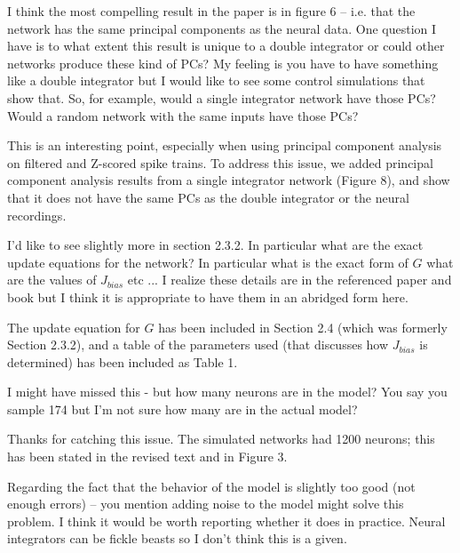 \documentclass[11pt,paper=letter]{scrartcl}
\begin{document}
\begin{quoting}
  I think the most compelling result in the paper is in figure 6 --
  i.e. that the network has the same principal components as the
  neural data. One question I have is to what extent this result is
  unique to a double integrator or could other networks produce these
  kind of PCs? My feeling is you have to have something like a double
  integrator but I would like to see some control simulations that
  show that. So, for example, would a single integrator network have
  those PCs? Would a random network with the same inputs have those
  PCs?
\end{quoting}

This is an interesting point,
especially when using principal component analysis
on filtered and Z-scored spike trains.
To address this issue, we added
principal component analysis results
from a single integrator network (Figure 8),
and show that it does not have
the same PCs as the double integrator
or the neural recordings.

\begin{quoting}
  I'd like to see slightly more in section 2.3.2. In particular what
  are the exact update equations for the network? In particular what
  is the exact form of $G$ what are the values of $J_{bias}$ etc ... I
  realize these details are in the referenced paper and book but I
  think it is appropriate to have them in an abridged form here.
\end{quoting}

The update equation for $G$ has been included in Section 2.4
(which was formerly Section 2.3.2),
and a table of the parameters used
(that discusses how $J_{bias}$ is determined)
has been included as Table 1.

\begin{quoting}
  I might have missed this - but how many neurons are in the model?
  You say you sample 174 but I'm not sure how many are in the actual
  model?
\end{quoting}

Thanks for catching this issue.
The simulated networks had 1200 neurons;
this has been stated in the revised text
and in Figure 3.

\begin{quoting}
  Regarding the fact that the behavior of the model is slightly too
  good (not enough errors) -- you mention adding noise to the model
  might solve this problem. I think it would be worth reporting
  whether it does in practice. Neural integrators can be fickle beasts
  so I don't think this is a given.
\end{quoting}
\end{document}
